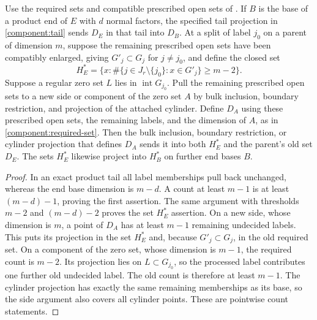 \begin{lemma}\label{component:counts}
Use the required sets and compatible prescribed open sets of
. If $B$ is the base of a product end of $E$ with $d$ normal factors,
the specified tail projection in \eqref{component:tail} sends
$D_E$ in that tail into $D_B$.
At a split of label $j_0$ on a parent of dimension $m$, suppose the
remaining prescribed open sets have been compatibly enlarged, giving $G'_j\subset G_j$ for
$j\ne j_0$, and define the closed set
\begin{equation}\label{component:count-set}
 H_E^*=\bigl\{x:\#\{j\in J_r\setminus\{j_0\}:x\in G'_j\}
                      \ge m-2\bigr\}.
\end{equation}
Suppose a regular zero set $L$ lies in $\operatorname{int}G_{j_0}$.
Pull the remaining prescribed open sets to a new side or component of the zero set $A$ by bulk
inclusion, boundary restriction, and projection of the attached cylinder.
Define $D_A$ using these prescribed open sets, the remaining labels, and the dimension
of $A$, as in \eqref{component:required-set}.
Then the bulk inclusion, boundary restriction, or cylinder projection
that defines $D_A$ sends it into both $H_E^*$ and the parent's old
set $D_E$.
The sets $H_E^*$ likewise project into $H_B^*$ on further end bases $B$.
\end{lemma}

\begin{proof}
In an exact product tail all label memberships pull back unchanged,
whereas the end base dimension is $m-d$.  A count at least $m-1$ is at
least $(m-d)-1$, proving the first assertion.  The same argument
with thresholds $m-2$ and $(m-d)-2$ proves the set $H_E^*$ assertion.
On a new side, whose dimension is $m$, a point of $D_A$ has at least
$m-1$ remaining undecided labels.  This puts its projection in the
set $H_E^*$ and, because $G'_j\subset G_j$, in the old required set.
On a component of the zero set, whose dimension is $m-1$, the required count is
$m-2$.  Its projection lies on $L\subset G_{j_0}$, so the processed
label contributes one further old undecided label.  The old count
is therefore at least $m-1$.  The cylinder projection has exactly
the same remaining memberships as its base, so the side argument
also covers all cylinder points.  These are pointwise count
statements.
\end{proof}

